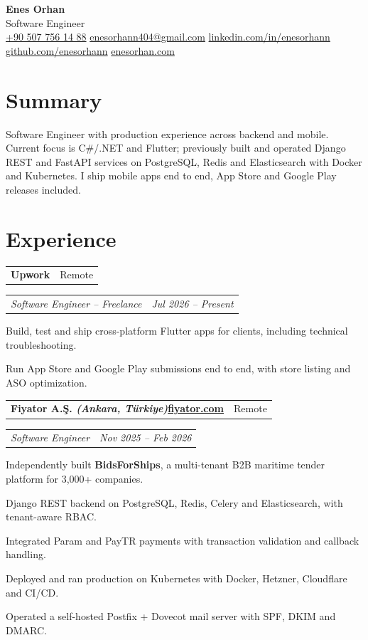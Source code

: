 \documentclass[10pt,a4paper]{extarticle}
\makeatletter
\newcommand{\sep}{\;\textperiodcentered\;}
\newcommand{\entry}[2]{%
\noindent\begin{tabular*}{\textwidth}{@{\extracolsep{\fill}}lr}
\textbf{#1} & #2\\
\end{tabular*}\vspace{1pt}
}
\newcommand{\subentry}[2]{%
\noindent\begin{tabular*}{\textwidth}{@{\extracolsep{\fill}}lr}
\textit{\color{muted}#1} & \textit{\color{muted}#2}\\
\end{tabular*}\vspace{2pt}
}
\makeatother
\begin{document}
\begin{center}
{\fontsize{23}{27}\selectfont\bfseries\color{accent}Enes Orhan}\\[4pt]
{\large\color{muted}Software Engineer}\;{\color{rulecol}\textbar}\\[6pt]
{\small
\href{tel:+905077561488}{+90 507 756 14 88}\sep
\href{mailto:enesorhann404@gmail.com}{enesorhann404@gmail.com}\sep
\href{https://linkedin.com/in/enesorhann}{linkedin.com/in/enesorhann}\sep
\href{https://github.com/enesorhann}{github.com/enesorhann}\sep
\href{https://enesorhan.com}{enesorhan.com}}
\end{center}

\section{Summary}
Software Engineer with production experience across backend and mobile. Current focus is C\#/.NET and Flutter; previously built
and operated Django REST and FastAPI services on PostgreSQL, Redis and Elasticsearch with Docker and Kubernetes. I ship
mobile apps end to end, App Store and Google Play releases included.

\section{Experience}

\entry{Upwork}{Remote}
\subentry{Software Engineer -- Freelance}{Jul 2026 -- Present}
\begin{bullets}
\item Build, test and ship cross-platform Flutter apps for clients, including technical troubleshooting.
\item Run App Store and Google Play submissions end to end, with store listing and ASO optimization.
\end{bullets}

\vspace{2pt}
\entry{Fiyator A.Ş. \textit{(Ankara, Türkiye)}\sep\href{https://fiyator.com}{fiyator.com}}{Remote}
\subentry{Software Engineer}{Nov 2025 -- Feb 2026}
\begin{bullets}
\item Independently built \textbf{BidsForShips}, a multi-tenant B2B maritime tender platform for 3,000+ companies.
\item Django REST backend on PostgreSQL, Redis, Celery and Elasticsearch, with tenant-aware RBAC.
\item Integrated Param and PayTR payments with transaction validation and callback handling.
\item Deployed and ran production on Kubernetes with Docker, Hetzner, Cloudflare and CI/CD.
\item Operated a self-hosted Postfix + Dovecot mail server with SPF, DKIM and DMARC.
\end{bullets}
\end{document}
